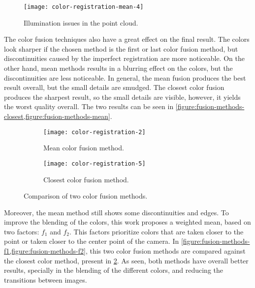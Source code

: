\begin{figure}[h]
    
    \centering
    \texttt{[image: color-registration-mean-4]}

    \caption{Illumination issues in the point cloud.}
    \label{figure:illumination-issues-pointcloud}

\end{figure}

The color fusion techniques also have a great effect on the final result. The colors look sharper if the chosen method is the first or last color fusion method, but discontinuities caused by the imperfect registration are more noticeable. On the other hand, mean methods results in a blurring effect on the colors, but the discontinuities are less noticeable. In general, the mean fusion produces the best result overall, but the small details are smudged. The closest color fusion produces the sharpest result, so the small details are visible, however, it yields the worst quality overall. The two results can be seen in \cref{figure:fusion-methods-closest,figure:fusion-methods-mean}.

\begin{figure}[h]
    
    \centering
    \begin{subfigure}[t]{0.7\textwidth}
        \centering
        \texttt{[image: color-registration-2]}

        \caption{Mean color fusion method.}
        \label{figure:fusion-methods-mean}
    \end{subfigure}

    \begin{subfigure}[t]{0.7\textwidth}
        \centering
        \texttt{[image: color-registration-5]}

        \caption{Closest color fusion method.}
        \label{figure:fusion-methods-closest}
    \end{subfigure}%

    \caption{Comparison of two color fusion methods.}
    \label{figure:fusion-methods-1}

\end{figure}

Moreover, the mean method still shows some discontinuities and edges. To improve the blending of the colors, this work proposes a weighted mean, based on two factors: $f_1$ and $f_2$. This factors prioritize colors that are taken closer to the point or taken closer to the center point of the camera. In \cref{figure:fusion-methods-f1,figure:fusion-methods-f2}, this two color fusion methods are compared against the closest color method, present in \cref{figure:fusion-methods-mean}. As seen, both methods have overall better results, specially in the blending of the different colors, and reducing the transitions between images.

